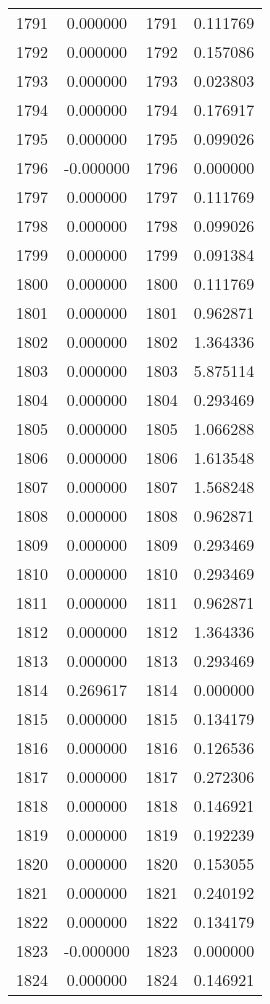\documentclass[12pt]{article}
\begin{document}
\begin{longtable}{@{}cccc@{}}
1791 & 0.000000 & 1791 & 0.111769 \\
1792 & 0.000000 & 1792 & 0.157086 \\
1793 & 0.000000 & 1793 & 0.023803 \\
1794 & 0.000000 & 1794 & 0.176917 \\
1795 & 0.000000 & 1795 & 0.099026 \\
1796 & -0.000000 & 1796 & 0.000000 \\
1797 & 0.000000 & 1797 & 0.111769 \\
1798 & 0.000000 & 1798 & 0.099026 \\
1799 & 0.000000 & 1799 & 0.091384 \\
1800 & 0.000000 & 1800 & 0.111769 \\
1801 & 0.000000 & 1801 & 0.962871 \\
1802 & 0.000000 & 1802 & 1.364336 \\
1803 & 0.000000 & 1803 & 5.875114 \\
1804 & 0.000000 & 1804 & 0.293469 \\
1805 & 0.000000 & 1805 & 1.066288 \\
1806 & 0.000000 & 1806 & 1.613548 \\
1807 & 0.000000 & 1807 & 1.568248 \\
1808 & 0.000000 & 1808 & 0.962871 \\
1809 & 0.000000 & 1809 & 0.293469 \\
1810 & 0.000000 & 1810 & 0.293469 \\
1811 & 0.000000 & 1811 & 0.962871 \\
1812 & 0.000000 & 1812 & 1.364336 \\
1813 & 0.000000 & 1813 & 0.293469 \\
1814 & 0.269617 & 1814 & 0.000000 \\
1815 & 0.000000 & 1815 & 0.134179 \\
1816 & 0.000000 & 1816 & 0.126536 \\
1817 & 0.000000 & 1817 & 0.272306 \\
1818 & 0.000000 & 1818 & 0.146921 \\
1819 & 0.000000 & 1819 & 0.192239 \\
1820 & 0.000000 & 1820 & 0.153055 \\
1821 & 0.000000 & 1821 & 0.240192 \\
1822 & 0.000000 & 1822 & 0.134179 \\
1823 & -0.000000 & 1823 & 0.000000 \\
1824 & 0.000000 & 1824 & 0.146921 \\

\end{longtable}
\end{document}
